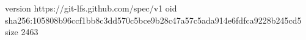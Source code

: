 version https://git-lfs.github.com/spec/v1
oid sha256:105808b96ccf1bb8c3dd570c5bce9b28c47a57c5ada914e6fdfca9228b245cd5
size 2463

